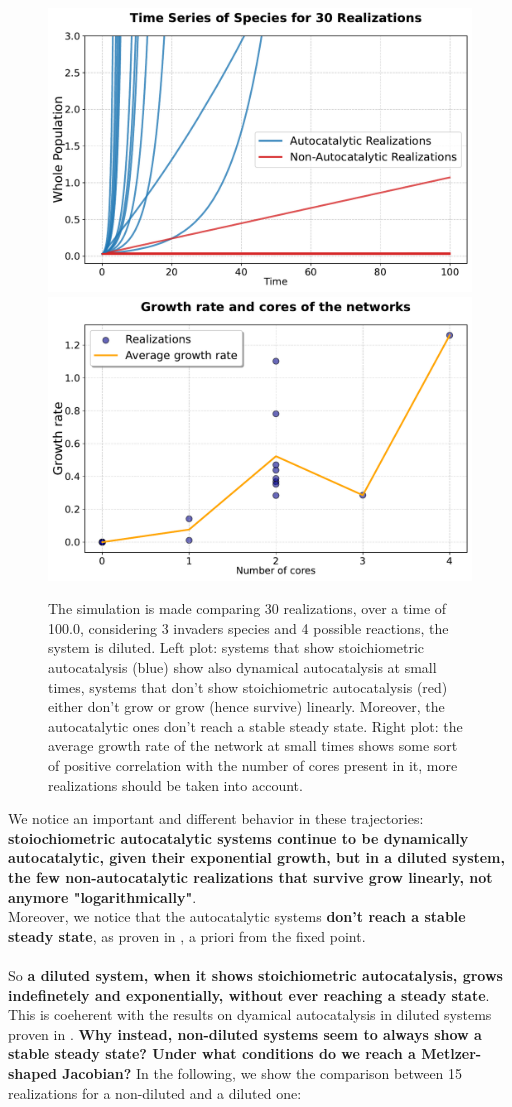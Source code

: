 \documentclass{article}
\begin{document}
\begin{figure}[H]
    \centering
    \includegraphics[width=0.45\linewidth]{traj_dil_elegant.pdf} 
   \includegraphics[width=0.45\linewidth]{growth_dil.pdf} 
 \caption{\small{The simulation is made comparing 30 realizations, over a time of 100.0, considering 3 invaders species and 4 possible reactions, the system is diluted. Left plot: systems that show stoichiometric autocatalysis (blue) show also dynamical autocatalysis at small times, systems that don't show stoichiometric autocatalysis (red) either don't grow or grow (hence survive) linearly. Moreover, the autocatalytic ones don't reach a stable steady state. Right plot: the average growth rate of the network at small times shows some sort of positive correlation with the number of cores present in it, more realizations should be taken into account.}}
   
    \label{Fig. 3}
\end{figure}

We notice an important and different behavior in these trajectories: \textbf{stoiochiometric autocatalytic systems continue to be dynamically autocatalytic, given their exponential growth, but in a diluted system, the few non-autocatalytic realizations that survive grow linearly, not anymore "logarithmically"}.
\\

Moreover, we notice that the autocatalytic systems \textbf{don't reach a stable steady state}, as proven in \cite{2}, a priori from the fixed point. 
\\
\\
So \textbf{a diluted system, when it shows stoichiometric autocatalysis, grows indefinetely and exponentially, without ever reaching a steady state}. This is coeherent with the results on dyamical autocatalysis in diluted systems proven in \cite{2}. \textbf{Why instead, non-diluted systems seem to always show a stable steady state? Under what conditions do we reach a Metlzer-shaped Jacobian?} In the following, we show the comparison between 15 realizations for a non-diluted and a diluted one:
\end{document}
